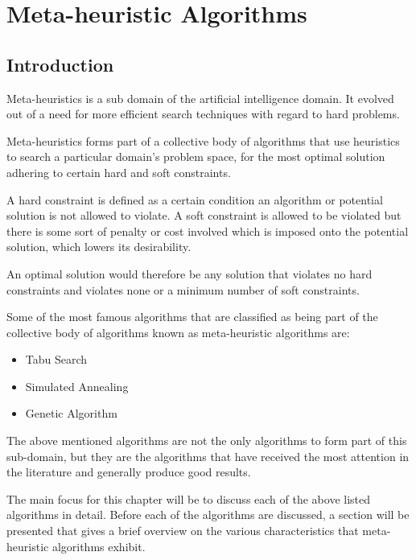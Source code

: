 \chapter{Meta-heuristic Algorithms}
\label{chpt:heuristic}
\section{Introduction}
Meta-heuristics is a sub domain of the artificial intelligence domain\cite{AIModernApproach}. It evolved out of a need for more efficient search techniques with regard to hard problems. 

Meta-heuristics forms part of a collective body of algorithms that use heuristics to search a particular domain's problem space, for the most optimal solution adhering to certain hard and soft constraints\cite{AIModernApproach,NatureInspiredMetaHeuristic}. 

A hard constraint is defined as a certain condition an algorithm or potential solution is not allowed to violate\cite{AIModernApproach,NatureInspiredMetaHeuristic,Karen2004,Eisenblatter}. A soft constraint is allowed to be violated but there is some sort of penalty or cost involved which is imposed onto the potential solution, which lowers its desirability\cite{AIModernApproach,NatureInspiredMetaHeuristic,Karen2004,Eisenblatter}. 

An optimal solution would therefore be any solution that violates no hard constraints and violates none or a minimum number of soft constraints\cite{AIModernApproach,NatureInspiredMetaHeuristic,Karen2004,Eisenblatter}.

Some of the most famous algorithms that are classified as being part of the collective body of algorithms known as meta-heuristic algorithms are:
\begin{itemize}
\item Tabu Search
\item Simulated Annealing
\item Genetic Algorithm
\end{itemize}
The above mentioned algorithms are not the only algorithms to form part of this sub-domain, but they are the algorithms that have received the most attention in the literature and generally produce good results\cite{SweepMeta}.

The main focus for this chapter will be to discuss each of the above listed algorithms in detail. Before each of the algorithms are discussed, a section will be presented that gives a brief overview on the various characteristics that meta-heuristic algorithms exhibit. 

